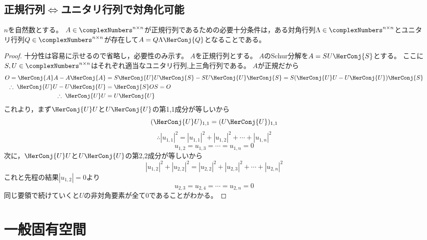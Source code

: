         \subsection{正規行列\texorpdfstring{$\iff$}{⇔}ユニタリ行列で対角化可能}
            \begin{shadebox}
                $n$を自然数とする。
                $A \in \complexNumbers^{n\times n}$が正規行列であるための必要十分条件は，ある対角行列$\Lambda \in \complexNumbers^{n \times n}$とユニタリ行列$Q \in \complexNumbers^{n \times n}$が存在して$A = Q\Lambda \HerConj{Q}$となることである。
            \end{shadebox}
            \begin{proof}
                十分性は容易に示せるので省略し，必要性のみ示す。
                $A$を正規行列とする。
                $A$のSchur分解を$A = SU\HerConj{S}$とする。
                ここに$S,U \in \complexNumbers^{n \times n}$はそれぞれ適当なユニタリ行列,上三角行列である。
                $A$が正規だから
                \begin{align*}
                    O = \HerConj{A}A - A\HerConj{A} &= S\HerConj{U}U\HerConj{S} - SU\HerConj{U}\HerConj{S} = S(\HerConj{U}U - U\HerConj{U})\HerConj{S} \\
                    \therefore\;\HerConj{U}U - U\HerConj{U} &= \HerConj{S}OS = O \\
                    \therefore\;\HerConj{U}U &= U\HerConj{U}
                \end{align*}
                これより，まず$\HerConj{U}U$と$U\HerConj{U}$の第1,1成分が等しいから
                \[ (\HerConj{U}U)_{1,1} = (U\HerConj{U})_{1,1} \]
                \[ \therefore |u_{1,1}|^2 = |u_{1,1}|^2 + |u_{1,2}|^2 + \dotsb + |u_{1,n}|^2 \]
                \[ u_{1,2} = u_{1,3} = \dotsb = u_{1,n} = 0 \]
                次に，$\HerConj{U}U$と$U\HerConj{U}$の第2,2成分が等しいから
                \[ |u_{1,2}|^2 + |u_{2,2}|^2 = |u_{2,2}|^2 + |u_{2,3}|^2 + \dotsb + |u_{2,n}|^2 \]
                これと先程の結果$|u_{1,2}| = 0$より
                \[ u_{2,3} = u_{2,4} = \dotsb = u_{2,n} = 0 \]
                同じ要領で続けていくと$U$の非対角要素が全て0であることがわかる。
            \end{proof}
    \section{一般固有空間}
